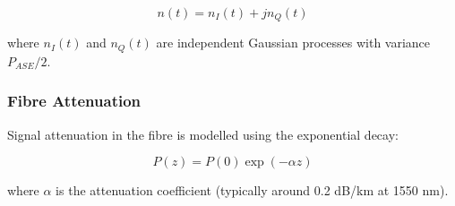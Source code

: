 \documentclass[journal]{IEEEtran}
\begin{document}
\begin{equation}
n(t) = n_I(t) + jn_Q(t)
\end{equation}

where $n_I(t)$ and $n_Q(t)$ are independent Gaussian processes with variance $P_{ASE}/2$.

\subsubsection{Fibre Attenuation}
Signal attenuation in the fibre is modelled using the exponential decay:

\begin{equation}
P(z) = P(0) \exp(-\alpha z)
\end{equation}

where $\alpha$ is the attenuation coefficient (typically around 0.2 dB/km at 1550 nm).
\end{document}
